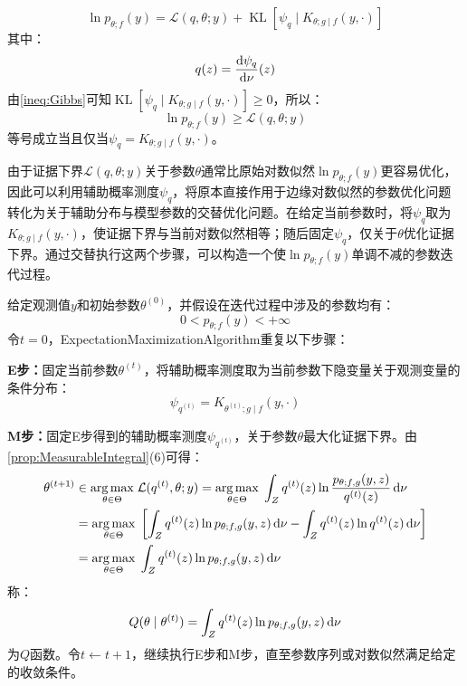 \begin{equation*}
	\ln p_{\theta;f}(y)=\mathcal{L}(q,\theta;y)+\operatorname{KL}[\psi_q\mid K_{\theta;g\mid f}(y,\cdot)]
\end{equation*}
其中：
\begin{equation*}
	q(z)=\frac{\mathop{}\!\mathrm{d}\psi_q}{\mathop{}\!\mathrm{d}\nu}(z)
\end{equation*}
由\cref{ineq:Gibbs}可知$\operatorname{KL}[\psi_q\mid K_{\theta;g\mid f}(y,\cdot)]\geqslant0$，所以：
\begin{equation*}
	\ln p_{\theta;f}(y)\geqslant\mathcal{L}(q,\theta;y)
\end{equation*}
等号成立当且仅当$\psi_q=K_{\theta;g\mid f}(y,\cdot)$。\par
由于证据下界$\mathcal{L}(q,\theta;y)$关于参数$\theta$通常比原始对数似然$\ln p_{\theta;f}(y)$更容易优化，因此可以利用辅助概率测度$\psi_q$，将原本直接作用于边缘对数似然的参数优化问题转化为关于辅助分布与模型参数的交替优化问题。在给定当前参数时，将$\psi_q$取为$K_{\theta;g\mid f}(y,\cdot)$，使证据下界与当前对数似然相等；随后固定$\psi_q$，仅关于$\theta$优化证据下界。通过交替执行这两个步骤，可以构造一个使$\ln p_{\theta;f}(y)$单调不减的参数迭代过程。
\begin{method}
	给定观测值$y$和初始参数$\theta^{(0)}$，并假设在迭代过程中涉及的参数均有：
	\begin{equation*}
		0<p_{\theta;f}(y)<+\infty
	\end{equation*}
	令$t=0$，\gls{ExpectationMaximizationAlgorithm}重复以下步骤：\par
	\textbf{E步：}固定当前参数$\theta^{(t)}$，将辅助概率测度取为当前参数下隐变量关于观测变量的条件分布：
	\begin{equation*}
		\psi_{q^{(t)}}=K_{\theta^{(t)};g\mid f}(y,\cdot)
	\end{equation*}\par
	\textbf{M步：}固定E步得到的辅助概率测度$\psi_{q^{(t)}}$，关于参数$\theta$最大化证据下界。由\cref{prop:MeasurableIntegral}(6)可得：
	\begin{align*}
		\theta^{(t+1)}&\in\underset{\theta\in\Theta}{\arg\max}\;\mathcal{L}(q^{(t)},\theta;y)=\underset{\theta\in\Theta}{\arg\max}\;\int_{Z}q^{(t)}(z)\ln\frac{p_{\theta;f,g}(y,z)}{q^{(t)}(z)}\mathop{}\!\mathrm{d}\nu \\
		&=\underset{\theta\in\Theta}{\arg\max}\;\left[\int_{Z}q^{(t)}(z)\ln p_{\theta;f,g}(y,z)\mathop{}\!\mathrm{d}\nu-\int_{Z}q^{(t)}(z)\ln q^{(t)}(z)\mathop{}\!\mathrm{d}\nu\right] \\
		&=\underset{\theta\in\Theta}{\arg\max}\;\int_{Z}q^{(t)}(z)\ln p_{\theta;f,g}(y,z)\mathop{}\!\mathrm{d}\nu
	\end{align*}
	称：
	\begin{equation*}
		Q(\theta\mid\theta^{(t)})=\int_{Z}q^{(t)}(z)\ln p_{\theta;f,g}(y,z)\mathop{}\!\mathrm{d}\nu
	\end{equation*}
	为$Q$函数。令$t\leftarrow t+1$，继续执行E步和M步，直至参数序列或对数似然满足给定的收敛条件。
\end{method}